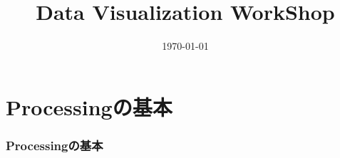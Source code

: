 \documentclass[dvipdfmx]{beamer}
\title{Data Visualization WorkShop}
\author{}
\institute[所属]{}
\date{\today}
\begin{document}
\begin{frame}[plain]\frametitle{}
	\titlepage
\end{frame}

\section{Processingの基本}
\begin{frame}\frametitle{Processingの基本}
\end{frame}
\end{document}
